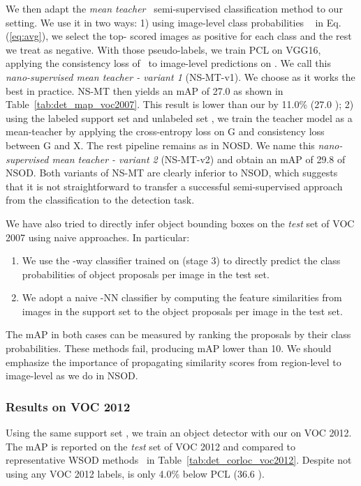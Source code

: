 We then adapt the \emph{mean teacher}~\cite{TV17} semi-supervised classification method to our setting. We use it in two ways: 1) using image-level class probabilities ~ in Eq.(\ref{eq:avg}), we select the top- scored images as positive for each class and the rest we treat as negative.
With those pseudo-labels, we train PCL on VGG16, applying the consistency loss of~\cite{TV17} to image-level predictions on . We call this \emph{nano-supervised mean teacher - variant 1} (NS-MT-v1).
We choose  as it works the best in practice. NS-MT then yields an mAP of 27.0 as shown in Table~\ref{tab:det_map_voc2007}. This result is lower than our \ours by {11.0\%} ({27.0} ); 2) using the labeled support set  and unlabeled set , we train the teacher model  as a mean-teacher by applying the cross-entropy loss on G and consistency loss between G and X. The rest pipeline remains as in NOSD. We name this \emph{nano-supervised mean teacher - variant 2} (NS-MT-v2) and obtain an mAP of 29.8  of NSOD. Both variants of NS-MT are clearly inferior to NSOD, which suggests that it is not straightforward to transfer a successful semi-supervised approach from the classification to the detection task.

We have also tried to directly infer object bounding
boxes on the \emph{test} set of VOC 2007 using naive approaches.
In particular:
\begin{enumerate}
	\item We use the -way classifier  trained on  (stage 3) to directly predict the class probabilities of object proposals per image in the test set.
	\item We adopt a naive -NN classifier by computing the feature similarities from images in the support set  to the object proposals per image in the test set.
\end{enumerate}
The mAP in both cases can be measured by ranking the proposals by their class probabilities. These methods fail, producing mAP lower than 10. We should emphasize the importance
of propagating similarity scores from region-level to image-level as we do in NSOD.


\subsubsection{Results on VOC 2012}
Using the same support set , we train an object detector with our \ours on VOC 2012. The mAP is reported on the \emph{test} set of VOC 2012 and compared to representative WSOD methods~\cite{tang2017cvpr,tang2018pami,zhang2018cvpr} in Table~\ref{tab:det_corloc_voc2012}.
Despite not using any VOC 2012 labels, \ours is only 4.0\% below PCL (36.6 ).


